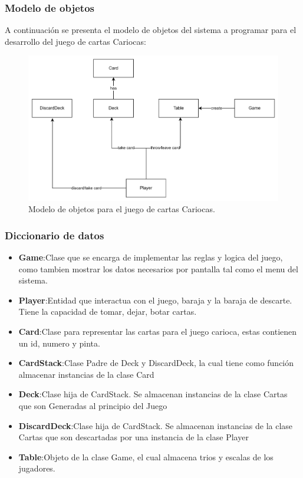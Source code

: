 \documentclass[60pt]{article}
\begin{document}
\subsubsection{Modelo de objetos}\label{cap:modelo-objetos}
A continuación se presenta el modelo de objetos del sistema a programar para el desarrollo del juego de cartas Cariocas:
\begin{figure}[H]
    \centering
    \includegraphics[width=15cm]{moobjetos.png}
    \caption{Modelo de objetos para el juego de cartas Cariocas.}
\end{figure}

\subsubsection{Diccionario de datos}\label{cap:diccionario-datos}
\begin{itemize}
    \item\textbf{Game}:Clase que se encarga de implementar las reglas y logica del juego, \\como tambien mostrar los datos necesarios por pantalla tal como el menu del sistema. 
    \item\textbf{Player}:Entidad que interactua con el juego, baraja y la baraja de descarte. Tiene la capacidad de tomar, dejar, botar cartas.
    \item\textbf{Card}:Clase para representar las cartas para el juego carioca, estas contienen un id, numero y pinta.
    \item\textbf{CardStack}:Clase Padre de Deck y DiscardDeck, la cual tiene como función almacenar instancias de la clase Card
    \item\textbf{Deck}:Clase hija de CardStack. Se almacenan instancias de la clase Cartas que son Generadas al principio del Juego
    \item\textbf{DiscardDeck}:Clase hija de CardStack. Se almacenan instancias de la clase Cartas que son descartadas por una instancia de la clase Player
    \item\textbf{Table}:Objeto de la clase Game, el cual almacena trios y escalas de los jugadores. 
\end{itemize}
\clearpage
\end{document}
